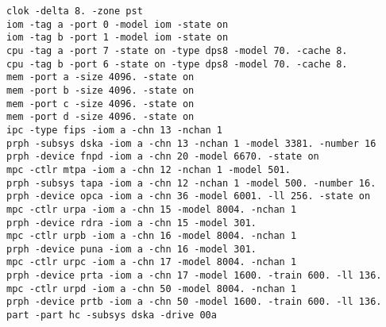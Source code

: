 \begin{adjustwidth}{5ex}{1ex}
    \texttt{clok -delta 8. -zone pst} \\
    \texttt{iom  -tag a -port 0 -model iom -state on} \\
    \texttt{iom  -tag b -port 1 -model iom -state on} \\
    \texttt{cpu  -tag a -port 7 -state on -type dps8 -model 70. -cache 8.} \\
    \texttt{cpu  -tag b -port 6 -state on -type dps8 -model 70. -cache 8.} \\
    \texttt{mem  -port a -size 4096. -state on} \\
    \texttt{mem  -port b -size 4096. -state on} \\
    \texttt{mem  -port c -size 4096. -state on} \\
    \texttt{mem  -port d -size 4096. -state on} \\
    \texttt{ipc  -type fips   -iom a -chn 13 -nchan 1} \\
    \texttt{prph -subsys dska -iom a -chn 13 -nchan 1 -model 3381. -number 16} \\
    \texttt{prph -device fnpd -iom a -chn 20 -model 6670. -state on} \\
    \texttt{mpc  -ctlr   mtpa -iom a -chn 12 -nchan 1 -model 501.} \\
    \texttt{prph -subsys tapa -iom a -chn 12 -nchan 1 -model 500. -number 16.} \\
    \texttt{prph -device opca -iom a -chn 36 -model 6001. -ll 256. -state on} \\
    \texttt{mpc  -ctlr   urpa -iom a -chn 15 -model 8004. -nchan 1} \\
    \texttt{prph -device rdra -iom a -chn 15 -model 301.} \\
    \texttt{mpc  -ctlr   urpb -iom a -chn 16 -model 8004. -nchan 1} \\
    \texttt{prph -device puna -iom a -chn 16 -model 301.} \\
    \texttt{mpc  -ctlr   urpc -iom a -chn 17 -model 8004. -nchan 1} \\
    \texttt{prph -device prta -iom a -chn 17 -model 1600. -train 600. -ll 136.} \\
    \texttt{mpc  -ctlr   urpd -iom a -chn 50 -model 8004. -nchan 1} \\
    \texttt{prph -device prtb -iom a -chn 50 -model 1600. -train 600. -ll 136.} \\
    \texttt{part -part hc -subsys dska -drive 00a} \\

\end{adjustwidth}
